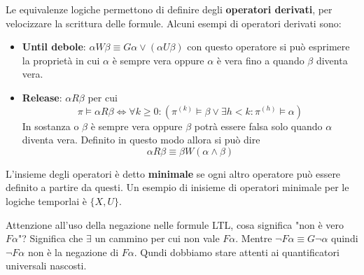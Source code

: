 Le equivalenze logiche permettono di definire degli \textbf{operatori derivati},
per velocizzare la scrittura delle formule. Alcuni esempi di operatori derivati
sono:
\begin{itemize}
    \item \textbf{Until debole}: $\alpha W \beta \equiv G\alpha \lor
              (\alpha U \beta)$ con questo operatore si può esprimere la proprietà
          in cui $\alpha$ è sempre vera oppure $\alpha$ è vera fino a quando
          $\beta$ diventa vera.
    \item \textbf{Release}: $\alpha R \beta$ per cui
          \begin{equation}
              \pi\vDash\alpha R \beta \iff \forall k\ge 0:(\pi^{(k)}\vDash \beta\lor
              \exists h<k:\pi^{(h)}\vDash \alpha)
          \end{equation}
          In sostanza o $\beta$ è sempre vera oppure $\beta$ potrà essere falsa
          solo quando $\alpha$ diventa vera. Definito in questo modo allora si può dire
          \begin{equation}
              \alpha R \beta \equiv \beta W (\alpha \land \beta)
          \end{equation}
\end{itemize}
\begin{definizione}
    L'insieme degli operatori è detto \textbf{minimale} se ogni altro
    operatore può essere definito a partire da questi. Un esempio di inisieme di
    operatori minimale per le logiche temporlai è $\{X,U\}$.
\end{definizione}
Attenzione all'uso della negazione nelle formule LTL, cosa significa "non è vero
$F\alpha$"?  Significa che $\exists$ un cammino per cui non vale $F\alpha$.  Mentre
$\lnot F\alpha \equiv G\lnot \alpha$ quindi $\lnot F\alpha$ non è la negazione di
$F\alpha$. Qundi dobbiamo stare attenti ai quantificatori universali nascosti.

